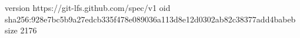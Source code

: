 version https://git-lfs.github.com/spec/v1
oid sha256:928e7bc5b9a27edcb335f478e089036a113d8e12d0302ab82c38377add4babeb
size 2176
